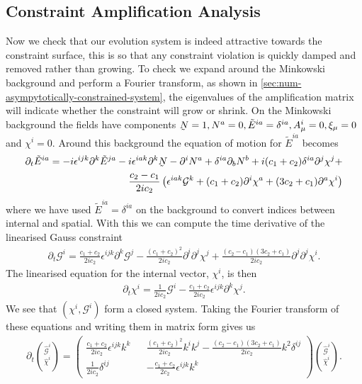 \documentclass[10pt]{report}
\newcommand{\utilde}[1]{\underaccent{\tilde}{#1}}
\theoremstyle{definition}
\newcommand{\tE}[0]{\tilde{E}}
\newcommand{\dlap}[0]{\utilde{N}}
\begin{document}
    \subsection{Constraint Amplification Analysis}
    Now we check that our evolution system is indeed attractive towards the constraint surface, this is so that any constraint violation is quickly damped and removed rather than growing. To check we expand around the Minkowski background and perform a Fourier transform, as shown in \cref{sec:num-asympytotically-constrained-system}, the eigenvalues of the amplification matrix will indicate whether the constraint will grow or shrink. On the Minkowski background the fields have components $\dlap = 1, N^a = 0, \tE^{ia} = \delta^{ia}, A^i_\mu =0, \xi_\mu = 0$ and $\chi^i = 0$. Around this background the equation of motion for $\tE^{ia}$ becomes 
    \begin{align}
        \partial_t \tE^{ia} = -i \epsilon^{ijk} \partial^k \tE^{ja} -i\epsilon^{iak} \partial^k \dlap - \partial^i N^a + \delta^{ia} \partial_b N^b + i(c_1 +c_2) \delta^{ia} \partial^j \chi^j + \nonumber \\ \frac{c_2 - c_1}{2ic_2} \left( \epsilon^{iak} \mathcal{G}^k + (c_1+c_2) \partial^i \chi^a + (3c_2 + c_1) \partial^a \chi^i \right)
    \end{align}
    where we have used $\tE^{ia} = \delta^{ia}$ on the background to convert indices between internal and spatial. With this we can compute the time derivative of the linearised Gauss constraint 
    \begin{align}
        \partial_t \mathcal{G}^i = \frac{c_1 + c_2}{2ic_2} \epsilon^{ijk} \partial^k \mathcal{G}^j - \frac{(c_1+c_2)^2}{2ic_2} \partial^i \partial^j \chi^j + \frac{(c_2-c_1)(3c_2 + c_1)}{2ic_2} \partial^j \partial^j \chi^i.
    \end{align}
    The linearised equation for the internal vector, $\chi^i$, is then 
    \begin{align}
        \partial_t \chi^i = \frac{1}{2ic_2} \mathcal{G}^i - \frac{c_1+c_2}{2ic_2} \epsilon^{ijk} \partial^k \chi^j.
    \end{align}
    We see that $(\chi^i,\mathcal{G}^i)$ form a closed system. Taking the Fourier transform of these equations and writing them in matrix form gives us 
    \begin{align}
        \partial_t \binom{\hat{\mathcal{G}}^i}{\hat{\chi}^i} = \begin{pmatrix}
            \frac{c_1 + c_2}{2ic_2} \epsilon^{ijk} k^k && \frac{(c_1+c_2)^2}{2ic_2} k^i k^j - \frac{(c_2 - c_1)(3c_2+c_1)}{2ic_2} k^2 \delta^{ij} \\ \frac{1}{2ic_2} \delta^{ij} && -\frac{c_1+c_2}{2c_2} \epsilon^{ijk} k^k
        \end{pmatrix} \binom{\hat{\mathcal{G}}^i}{\hat{\chi}^i}.
    \end{align}
\end{document}
